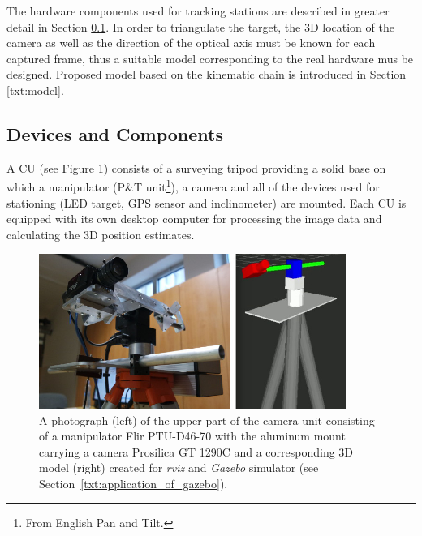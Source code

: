 The hardware components used for tracking stations are described in greater detail in Section \ref{txt:devices}. In order to triangulate the target, the 3D location of the camera as well as the direction of the optical axis must be known for each captured frame, thus a suitable model corresponding to the real hardware mus be designed. Proposed model based on the kinematic chain is introduced in Section \ref{txt:model}.

\subsection{Devices and Components} \label{txt:devices}

A CU (see Figure \ref{fig:camera_unit_photo_model}) consists of a surveying tripod providing a solid base on which a manipulator (P\&T unit\footnote{From English Pan and Tilt.}), a camera and all of the devices used for stationing (LED target, GPS sensor and inclinometer) are mounted. Each CU is equipped with its own desktop computer for processing the image data and calculating the 3D position estimates.

\begin{figure}[tbh]
	\centering
	\includegraphics[width=10cm]{fig/camera_unit_photo_model.jpg}
	\caption{A photograph (left) of the upper part of the camera unit consisting of a manipulator Flir PTU-D46-70 with the aluminum mount carrying a camera Prosilica GT 1290C and a corresponding 3D model (right) created for \textit{rviz} and \textit{Gazebo} simulator (see Section~\ref{txt:application_of_gazebo}).}
	\label{fig:camera_unit_photo_model}
\end{figure}

